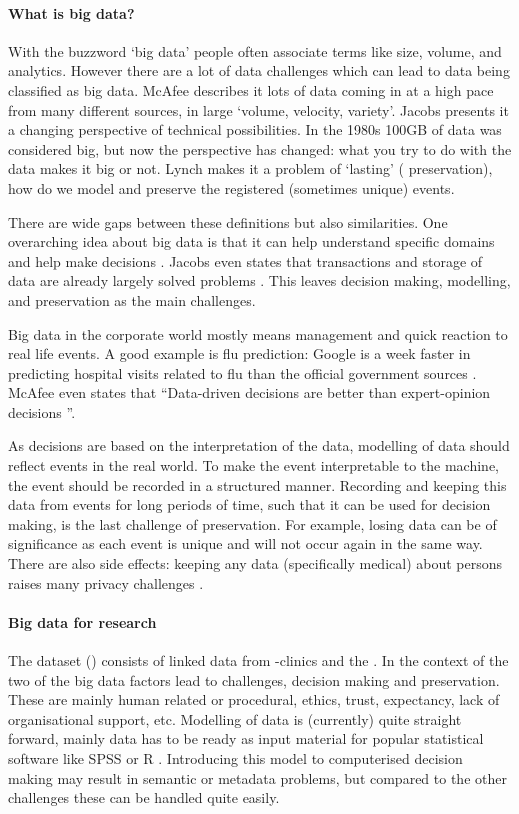 \paragraph{What is big data?}
With the buzzword `big data' people often associate terms like size, volume, and analytics.
However there are a lot of data challenges which can lead to data being classified as big data.
McAfee \cite{dsb1mcafee} describes it lots of data coming in at a high pace from many different sources, in large `volume, velocity, variety'.
Jacobs \cite{dsb5jacobs} presents it a changing perspective of technical possibilities.
In the 1980s 100GB of data was considered big, but now the perspective has changed: what you try to do with the data makes it big or not.
Lynch \cite{dsb3lynch} makes it a problem of `lasting' (\ie{} preservation), how do we model and preserve the registered (sometimes unique) events.

There are wide gaps between these definitions but also similarities.
One overarching idea about big data is that it can help understand specific domains and help make decisions \cite{dsb2lohr}.
Jacobs even states that transactions and storage of data are already largely solved problems \cite{dsb5jacobs}.
This leaves decision making, modelling, and preservation as the main challenges.

Big data in the corporate world mostly means management and quick reaction to real life events.
A good example is flu prediction: Google is a week faster in predicting hospital visits related to flu than the official government sources \cite{dsb8dugas, dsb1mcafee}.
McAfee even states that ``Data-driven decisions are better than expert-opinion decisions \cite{dsb1mcafee}''.

As decisions are based on the interpretation of the data, modelling of data should reflect events in the real world.
To make the event interpretable to the machine, the event should be recorded in a structured manner.
Recording and keeping this data from events for long periods of time, such that it can be used for decision making, is the last challenge of preservation.
For example, losing data can be of significance as each event is unique and will not occur again in the same way.
There are also side effects: keeping any data (specifically medical) about persons raises many privacy challenges \cite{dsb1mcafee}.

\paragraph{Big data for \project{} research}
The \project{} dataset (\projectdata{}) consists of linked data from \IVF{}-clinics and the \PRN{}.
In the context of the \projectdata{} two of the big data factors lead to challenges, decision making and preservation.
These are mainly human related or procedural, \eg{} ethics, trust, expectancy, lack of organisational support, etc.
Modelling of data is (currently) quite straight forward, mainly data has to be ready as input material for popular statistical software like SPSS \cite{spssSoftware} or R \cite{rSoftware}.
Introducing this model to computerised decision making may result in semantic or metadata problems, but compared to the other challenges these can be handled quite easily.

